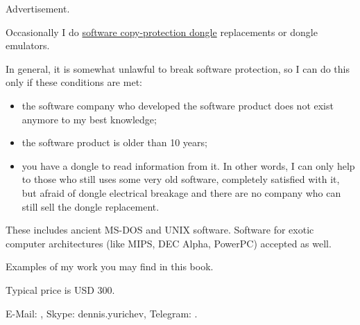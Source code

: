 
Advertisement.

Occasionally I do \href{https://en.wikipedia.org/wiki/Software_protection_dongle}{software copy-protection dongle} replacements or dongle emulators.

In general, it is somewhat unlawful to break software protection, so I can do this only if these conditions are met:

	\begin{itemize}
	\item the software company who developed the software product does not exist anymore to my best knowledge;
	\item the software product is older than 10 years;
	\item you have a dongle to read information from it. In other words, I can only help to those who still uses some very old software, completely satisfied with it, but afraid of dongle electrical breakage and there are no company who can still sell the dongle replacement.
	\end{itemize}

These includes ancient MS-DOS and UNIX software. Software for exotic computer architectures (like MIPS, DEC Alpha, PowerPC) accepted as well.

Examples of my work you may find in this book.

Typical price is USD 300.

E-Mail: \EMAIL{}, Skype: dennis.yurichev, Telegram: .

